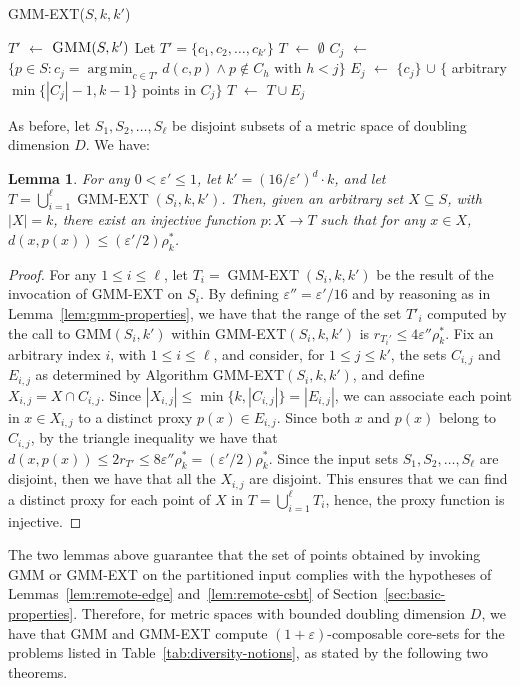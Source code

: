 \documentclass{article}
\newtheorem{lemma}{Lemma}
\DeclareMathOperator*{\argmin}{arg\,min}
\renewcommand{\epsilon}{\varepsilon}
\newcommand{\Let}[2]{#1 $\leftarrow$ #2} \SetKw{To}{to}
\begin{document}
\begin{algorithm}[t]
  \caption{{\sc GMM-EXT}($S, k, k'$)}
  \label{alg:GMM-EXT}
  \DontPrintSemicolon 
  \Let{$T'$}{$\text{\sc GMM}(S,k')$}\;
  Let $T' = \{c_1, c_2, \ldots, c_{k'}\}$\;
  \Let{$T$}{$\emptyset$}\;
  \For{\Let{$j$}{$1$} \To $k'$} {
    \Let{$C_j$}{$\{p\in S: c_j=\argmin_{c\in T'} d(c,p) \wedge p \not\in C_h
      \mbox{ with $h < j$}\}$} \;
    \Let{$E_j$}{$\{c_j\}$ $\cup$ $\{$ arbitrary $\min\{|C_j|-1, k-1\}$ points in $C_j\}$ }\;
    \Let{$T$}{$T\cup E_j$}\;
  }
  \;
\end{algorithm}

As before, let $S_1,S_2,\dots,S_\ell$ be disjoint subsets of a metric
space of doubling dimension $D$. We have:
\begin{lemma}\label{lem:gmm-ext-properties}
  For any $0 < \epsilon' \leq 1$, let $k'=(16/\epsilon')^d\cdot k$,
  and let $T=\bigcup_{i=1}^\ell \operatorname{GMM-EXT}(S_i, k,
  k')$. Then, given an arbitrary set $X \subseteq S$, with $|X|=k$,
  there exist an injective function $p: X \rightarrow T$ such that for
  any $x\in X$, $d(x, p(x)) \le (\epsilon'/2)\rho_k^*$.
\end{lemma}
\begin{proof}
  For any $1\le i\le\ell$, let
  $T_i=\operatorname{GMM-EXT}(S_i, k ,k')$ be the result of the
  invocation of {\sc GMM-EXT} on $S_i$. By defining
  $\epsilon''=\epsilon'/16$ and by reasoning as in
  Lemma~\ref{lem:gmm-properties}, we have that the range of the set
  $T'_i$ computed by the call to {\sc GMM}$(S_i, k')$ within {\sc
    GMM-EXT}$(S_i,k,k')$ is $r_{T_i'}\le 4\epsilon''\rho_k^*$. Fix an
  arbitrary index $i$, with $1 \leq i \leq \ell$, and consider, for
  $1\leq j\leq k'$, the sets $C_{i,j}$ and $E_{i,j}$ as determined by
  Algorithm {\sc GMM-EXT}$(S_i,k,k')$, and define
  $X_{i,j} = X\cap C_{i,j}$. Since
  $|X_{i,j}|\leq\min\{k,|C_{i,j}|\} = |E_{i,j}|$, we can associate
  each point in $x\in X_{i,j}$ to a distinct proxy $p(x)\in E_{i,j}$.
  Since both $x$ and $p(x)$ belong to $C_{i,j}$, by the triangle
  inequality we have that
  $d(x,p(x))\leq 2r_{T'} \le 8\epsilon''\rho_k^* =
  (\epsilon'/2)\rho_k^*$. Since the input sets
  $S_1, S_2, \dots, S_\ell$ are disjoint, then we have that all the
  $X_{i,j}$ are disjoint. This ensures that we can find a distinct
  proxy for each point of $X$ in $T=\bigcup_{i=1}^\ell T_i$, hence,
  the proxy function is injective.
\end{proof}

The two lemmas above guarantee that the set of points obtained by
invoking {\sc GMM} or {\sc GMM-EXT} on the partitioned input complies
with the hypotheses of Lemmas~\ref{lem:remote-edge}
and~\ref{lem:remote-csbt} of
Section~\ref{sec:basic-properties}.  Therefore, for metric spaces with
bounded doubling dimension $D$, we have that {\sc GMM} and {\sc
  GMM-EXT} compute $(1+\epsilon)$-composable core-sets for the
problems listed in Table~\ref{tab:diversity-notions}, as stated by the
following two theorems.
\end{document}
